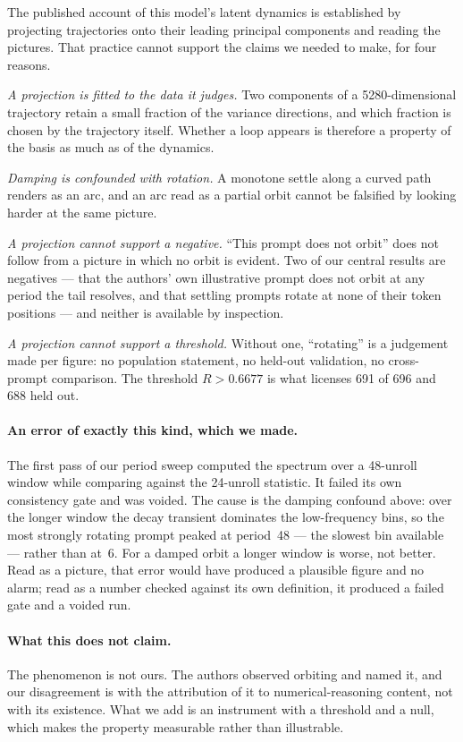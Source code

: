 \documentclass{zapiski}
\begin{document}
The published account of this model's latent dynamics is established by projecting trajectories
onto their leading principal components and reading the pictures. That practice cannot support the
claims we needed to make, for four reasons.

\emph{A projection is fitted to the data it judges.} Two components of a 5280-dimensional
trajectory retain a small fraction of the variance directions, and which fraction is chosen by the
trajectory itself. Whether a loop appears is therefore a property of the basis as much as of the
dynamics.

\emph{Damping is confounded with rotation.} A monotone settle along a curved path renders as an
arc, and an arc read as a partial orbit cannot be falsified by looking harder at the same picture.

\emph{A projection cannot support a negative.} ``This prompt does not orbit'' does not follow from
a picture in which no orbit is evident. Two of our central results are negatives --- that the
authors' own illustrative prompt does not orbit at any period the tail resolves, and that settling
prompts rotate at none of their token positions --- and neither is available by inspection.

\emph{A projection cannot support a threshold.} Without one, ``rotating'' is a judgement made per
figure: no population statement, no held-out validation, no cross-prompt comparison. The threshold
$R > 0.6677$ is what licenses 691 of 696 and 688 held out.

\paragraph{An error of exactly this kind, which we made.} The first pass of our period sweep
computed the spectrum over a 48-unroll window while comparing against the 24-unroll statistic. It
failed its own consistency gate and was voided. The cause is the damping confound above: over the
longer window the decay transient dominates the low-frequency bins, so the most strongly rotating
prompt peaked at period~48 --- the slowest bin available --- rather than at~6. For a damped orbit a
longer window is worse, not better. Read as a picture, that error would have produced a plausible
figure and no alarm; read as a number checked against its own definition, it produced a failed gate
and a voided run.

\paragraph{What this does not claim.} The phenomenon is not ours. The authors observed orbiting and
named it, and our disagreement is with the attribution of it to numerical-reasoning content, not
with its existence. What we add is an instrument with a threshold and a null, which makes the
property measurable rather than illustrable.
\end{document}
